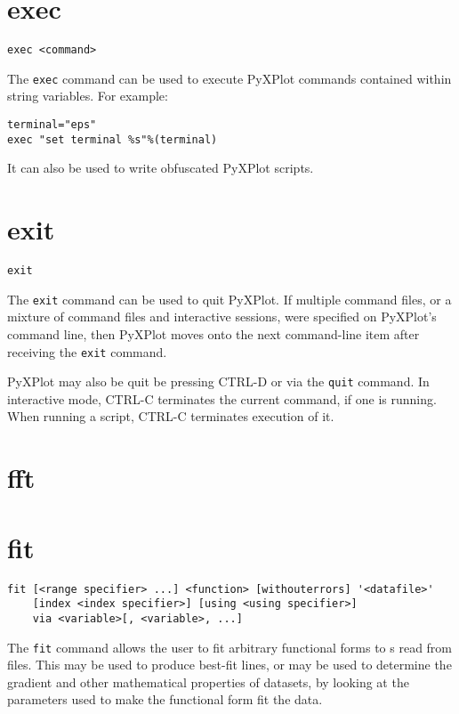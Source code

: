 \section{exec}

\begin{verbatim}
exec <command>
\end{verbatim}

The {\tt exec} command can be used to execute PyXPlot commands contained within
string variables. For example:

\begin{verbatim}
terminal="eps"
exec "set terminal %s"%(terminal)
\end{verbatim}

It can also be used to write obfuscated PyXPlot scripts.


\section{exit}

\begin{verbatim}
exit
\end{verbatim}

The {\tt exit} command can be used to quit PyXPlot. If multiple command files,
or a mixture of command files and interactive sessions, were specified on
PyXPlot's command line, then PyXPlot moves onto the next command-line item
after receiving the {\tt exit} command.

PyXPlot may also be quit be pressing CTRL-D or via the {\tt quit} command. In
interactive mode, CTRL-C terminates the current command, if one is running.
When running a script, CTRL-C terminates execution of it.


\section{fft}


\section{fit}

\begin{verbatim}
fit [<range specifier> ...] <function> [withouterrors] '<datafile>'
    [index <index specifier>] [using <using specifier>]
    via <variable>[, <variable>, ...]
\end{verbatim}

The {\tt fit} command allows the user to fit arbitrary functional forms to
\datapoint s read from files.  This may be used to produce best-fit lines, or
may be used to determine the gradient and other mathematical properties of
datasets, by looking at the parameters used to make the functional form fit the
data.

